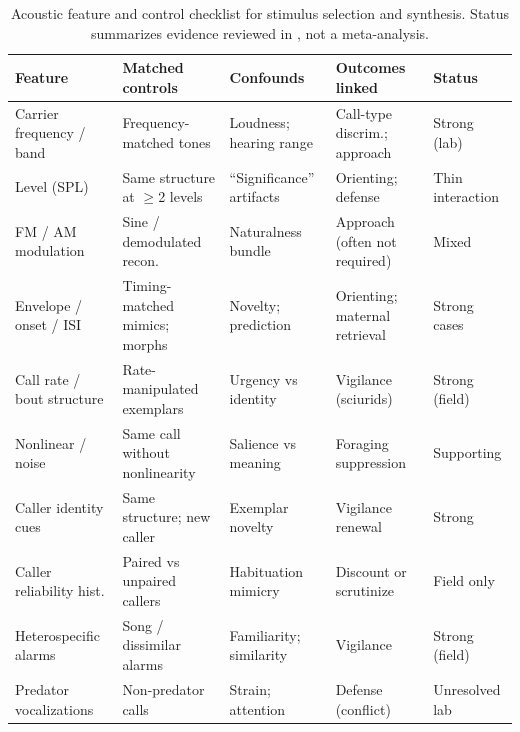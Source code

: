 \begin{table}[tbp]
\centering
\footnotesize
\singlespacing
\caption{Acoustic feature and control checklist for stimulus selection and synthesis. Status summarizes evidence reviewed in , not a meta-analysis.}
\label{tab:features}
\begin{tabular}{@{}p{1.25in}p{1.45in}p{1.35in}p{1.2in}p{0.9in}@{}}
\toprule
\textbf{Feature} & \textbf{Matched controls} & \textbf{Confounds} & \textbf{Outcomes linked} & \textbf{Status} \\
\midrule
Carrier frequency / band & Frequency-matched tones & Loudness; hearing range & Call-type discrim.; approach & Strong (lab) \\
\addlinespace[2pt]
Level (SPL) & Same structure at $\geq$2 levels & ``Significance'' artifacts & Orienting; defense & Thin interaction \\
\addlinespace[2pt]
FM / AM modulation & Sine / demodulated recon. & Naturalness bundle & Approach (often not required) & Mixed \\
\addlinespace[2pt]
Envelope / onset / ISI & Timing-matched mimics; morphs & Novelty; prediction & Orienting; maternal retrieval & Strong cases \\
\addlinespace[2pt]
Call rate / bout structure & Rate-manipulated exemplars & Urgency vs identity & Vigilance (sciurids) & Strong (field) \\
\addlinespace[2pt]
Nonlinear / noise & Same call without nonlinearity & Salience vs meaning & Foraging suppression & Supporting \\
\addlinespace[2pt]
Caller identity cues & Same structure; new caller & Exemplar novelty & Vigilance renewal & Strong \\
\addlinespace[2pt]
Caller reliability hist. & Paired vs unpaired callers & Habituation mimicry & Discount or scrutinize & Field only \\
\addlinespace[2pt]
Heterospecific alarms & Song / dissimilar alarms & Familiarity; similarity & Vigilance & Strong (field) \\
\addlinespace[2pt]
Predator vocalizations & Non-predator calls & Strain; attention & Defense (conflict) & Unresolved lab \\
\bottomrule
\end{tabular}
\end{table}
